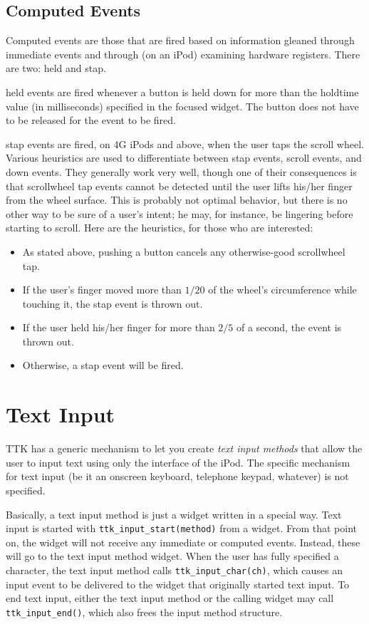 \documentclass[12pt,letterpaper]{report}
\begin{document}
\subsection{Computed Events}
Computed events are those that are fired based on information gleaned through immediate events
and through (on an iPod) examining hardware registers. There are two: {\sf held} and {\sf stap}.

{\sf held} events are fired whenever a button is held down for more than the {\sf holdtime} value (in
milliseconds) specified in the focused widget. The button does not have to be released for the
event to be fired.

{\sf stap} events are fired, on 4G iPods and above, when the user taps the scroll wheel. Various heuristics
are used to differentiate between {\sf stap} events, {\sf scroll} events, and {\sf down} events.
They generally work very well, though one of their consequences is that scrollwheel tap events cannot
be detected until the user lifts his/her finger from the wheel surface. This is probably not optimal
behavior, but there is no other way to be sure of a user's intent; he may, for instance, be lingering
before starting to scroll. Here are the heuristics, for those who are interested:
\begin{itemize}
\item As stated above, pushing a button cancels any otherwise-good scrollwheel tap.
\item If the user's finger moved more than $1/20$ of the wheel's circumference while touching it,
      the {\sf stap} event is thrown out.
\item If the user held his/her finger for more than $2/5$ of a second, the event is thrown out.
\item Otherwise, a {\sf stap} event will be fired.
\end{itemize}

\section{Text Input}
TTK has a generic mechanism to let you create {\sl text input methods} that allow the user to input
text using only the interface of the iPod. The specific mechanism for text input (be it an onscreen
keyboard, telephone keypad, whatever) is not specified.

Basically, a text input method is just a widget written in a special way. Text input is started
with \verb|ttk_input_start(method)| from a widget. From that point on, the widget will not receive
any immediate or computed events. Instead, these will go to the text input method widget. When the
user has fully specified a character, the text input method calls \verb|ttk_input_char(ch)|, which
causes an {\sf input} event to be delivered to the widget that originally started text input.
To end text input, either the text input method or the calling widget may call \verb|ttk_input_end()|,
which also frees the input method structure.
\end{document}
